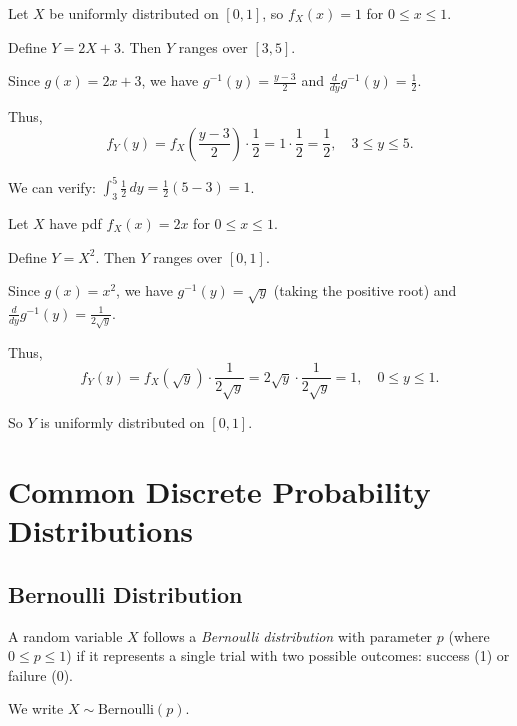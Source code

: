 \begin{eg}
Let \(X\) be uniformly distributed on \([0, 1]\), so \(f_X(x) = 1\) for \(0 \le x \le 1\).

Define \(Y = 2X + 3\). Then \(Y\) ranges over \([3, 5]\).

Since \(g(x) = 2x + 3\), we have \(g^{-1}(y) = \frac{y - 3}{2}\) and \(\frac{d}{dy} g^{-1}(y) = \frac{1}{2}\).

Thus,
\[
f_Y(y) = f_X\left(\frac{y - 3}{2}\right) \cdot \frac{1}{2} = 1 \cdot \frac{1}{2} = \frac{1}{2}, \quad 3 \le y \le 5.
\]

We can verify: \(\int_3^5 \frac{1}{2} \, dy = \frac{1}{2}(5 - 3) = 1\). 
\end{eg}

\begin{eg}
Let \(X\) have pdf \(f_X(x) = 2x\) for \(0 \le x \le 1\).

Define \(Y = X^2\). Then \(Y\) ranges over \([0, 1]\).

Since \(g(x) = x^2\), we have \(g^{-1}(y) = \sqrt{y}\) (taking the positive root) and \(\frac{d}{dy} g^{-1}(y) = \frac{1}{2\sqrt{y}}\).

Thus,
\[
f_Y(y) = f_X(\sqrt{y}) \cdot \frac{1}{2\sqrt{y}} = 2\sqrt{y} \cdot \frac{1}{2\sqrt{y}} = 1, \quad 0 \le y \le 1.
\]

So \(Y\) is uniformly distributed on \([0, 1]\).
\end{eg}


\section{Common Discrete Probability Distributions}

\subsection{Bernoulli Distribution}

\begin{definition}
A random variable \(X\) follows a \emph{Bernoulli distribution} with parameter \(p\) (where \(0 \le p \le 1\)) if it represents a single trial with two possible outcomes: success (1) or failure (0).

We write \(X \sim \text{Bernoulli}(p)\).
\end{definition}

